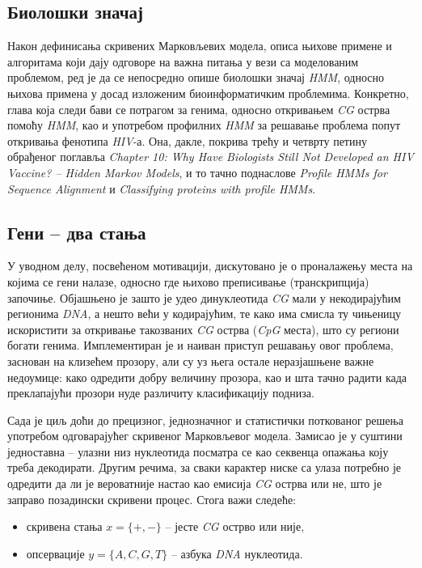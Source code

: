 \documentclass[12pt,oneside]{memoir}
\begin{document}
\begin{CJK}{UTF8}{ipxm}
\chapter{Биолошки значај}
Након дефинисања скривених Марковљевих модела, описа њихове примене и алгоритама који дају одговоре на важна питања у вези са моделованим проблемом, ред је да се непосредно опише биолошки значај \textit{HMM}, односно њихова примена у досад изложеним биоинформатичким проблемима. Конкретно, глава која следи бави се потрагом за генима, односно откривањем \textit{CG} острва помоћу \textit{HMM}, као и употребом профилних \textit{HMM} за решавање проблема попут откривања фенотипа \textit{HIV}-а. Она, дакле, покрива трећу и четврту петину обрађеног поглавља \textit{Chapter 10: Why Have Biologists Still Not Developed an HIV Vaccine? -- Hidden Markov Models}, и то тачно поднаслове \textit{Profile HMMs for Sequence Alignment} и \textit{Classifying proteins with profile HMMs}.

\section{Гени -- два стања}
У уводном делу, посвећеном мотивацији, дискутовано је о проналажењу места на којима се гени налазе, односно где њихово преписивање (транскрипција) започиње. Објашњено је зашто је удео динуклеотида \textit{CG} мали у некодирајућим регионима \textit{DNA}, а нешто већи у кодирајућим, те како има смисла ту чињеницу искористити за откривање такозваних \textit{CG} острва (\textit{CpG} места), што су региони богати генима. Имплементиран је и наиван приступ решавању овог проблема, заснован на клизећем прозору, али су уз њега остале неразјашњене важне недоумице: како одредити добру величину прозора, као и шта тачно радити када преклапајући прозори нуде различиту класификацију подниза.

Сада је циљ доћи до прецизног, једнозначног и статистички поткованог решења употребом одговарајућег скривеног Марковљевог модела. Замисао је у суштини једноставна -- улазни низ нуклеотида посматра се као секвенца опажања коју треба декодирати. Другим речима, за сваки карактер ниске са улаза потребно је одредити да ли је вероватније настао као емисија \textit{CG} острва или не, што је заправо позадински скривени процес. Стога важи следеће:
\begin{itemize}
  \item скривена стања $x = \{+, -\}$ -- јесте \textit{CG} острво или није,
  \item опсервације $y = \{A, C, G, T\}$ -- азбука \textit{DNA} нуклеотида.
\end{itemize}


\end{CJK}
\end{document}
